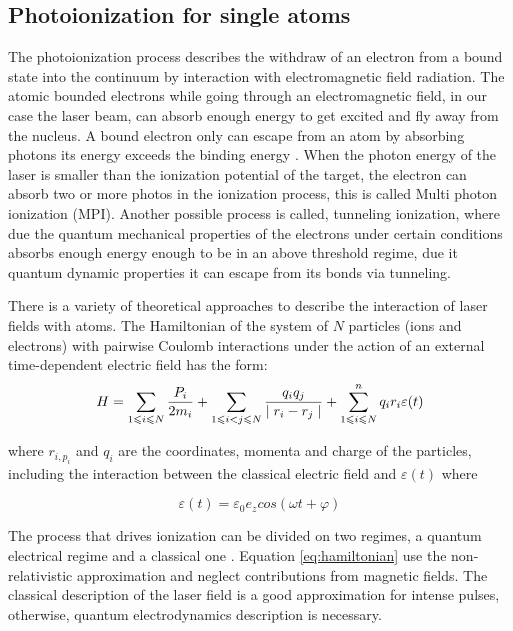 \subsection{Photoionization for single atoms}

The photoionization process describes the withdraw of an electron from a bound state into the continuum by interaction with electromagnetic field radiation\cite{berkowitz_photoabsorption_1979}. The atomic bounded electrons while going through an electromagnetic field, in our case the laser beam, can absorb enough energy to get excited and fly away from the nucleus. A bound electron only can escape from an atom by absorbing photons its energy exceeds the binding energy \cite{einstein_uber_1905}. When the photon energy of the laser is smaller than the ionization potential of the target, the electron can absorb two or more photos in the ionization process, this is called Multi photon ionization (MPI). Another possible process is called, tunneling ionization, where due the quantum mechanical properties of the electrons under certain conditions absorbs enough energy enough to be in an above threshold regime, due it quantum dynamic properties it can escape from its bonds via tunneling.

There is a variety of theoretical approaches to describe the interaction of laser fields with atoms. The Hamiltonian of the system of $N$ particles (ions and electrons) with pairwise Coulomb interactions under the action of an external time-dependent electric field has the form:
\begin{equation}  \label{eq:hamiltonian}
\centering
H = \displaystyle\sum_{1 \leqslant i \leqslant N}^{} \dfrac{P_{i}}{2m_{i}} + \displaystyle\sum_{1 \leqslant i < j \leqslant N}^{} \dfrac{q_{i}q_{j}}{\mid r_{i}-r_{j} \mid} + \displaystyle\sum_{1 \leqslant i \leqslant N}^{n} q_{i}r_{i}\varepsilon(t)
\end{equation}

where $ r_{i,  p_{i}} $ and $ q_{i} $ are the coordinates, momenta and charge of the particles, including the interaction between the classical electric field and $ \varepsilon(t) $ where \cite{mikaberidze_atomic_1981}

\begin{equation}
\varepsilon(t) = \varepsilon_{0} e_{z}cos(\omega t + \varphi)
\end{equation}

The process that drives ionization can be divided on two regimes, a quantum electrical regime and a classical one \cite{karnakov_strong_2009}. Equation \ref{eq:hamiltonian} use the non-relativistic approximation and neglect contributions from magnetic fields. The classical description of the laser field is a good approximation for intense pulses, otherwise, quantum electrodynamics description is necessary.

